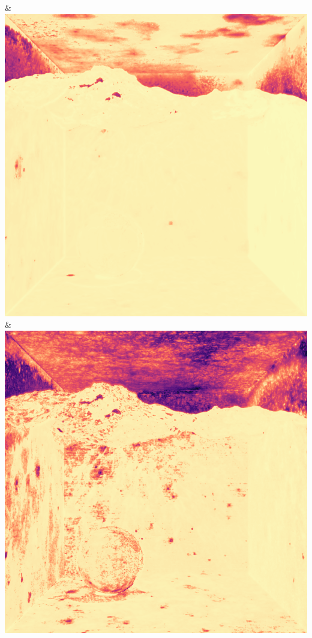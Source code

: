 & \includegraphics[width=\linewidth]{figures/py/tests/quality_comparison/nrc+pt_1spp_caustics_small_flip.png}
& \includegraphics[width=\linewidth]{figures/py/tests/quality_comparison/nrc+pt+sl_1spp_caustics_small_flip.png}
